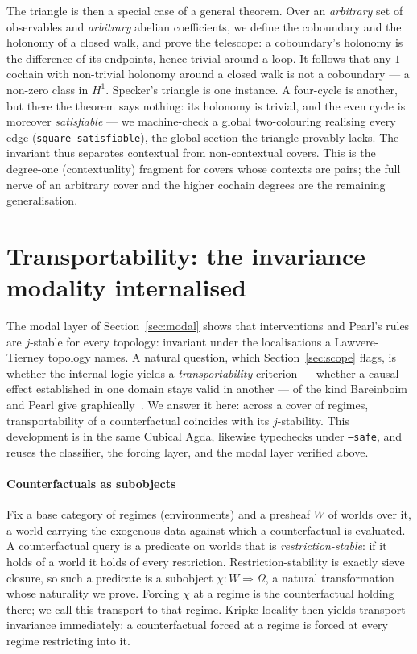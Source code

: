 \documentclass{lmcs}
\newcommand{\Om}{\Omega}
\begin{document}
The triangle is then a special case of a general theorem.
Over an \emph{arbitrary} set of observables and \emph{arbitrary} abelian coefficients, we define the coboundary and the holonomy of a closed walk, and prove the telescope: a coboundary's holonomy is the difference of its endpoints, hence trivial around a loop. It follows that any $1$-cochain with non-trivial holonomy around a closed walk is not a coboundary --- a non-zero class in $H^1$.
Specker's triangle is one instance. A four-cycle is another, but there the theorem says nothing: its holonomy is trivial, and the even cycle is moreover \emph{satisfiable} --- we machine-check a global two-colouring realising every edge (\texttt{square-satisfiable}), the global section the triangle provably lacks. The invariant thus separates contextual from non-contextual covers.
This is the degree-one (contextuality) fragment for covers whose contexts are pairs; the full nerve of an arbitrary cover and the higher cochain degrees are the remaining generalisation.

\section{Transportability: the invariance modality internalised}\label{sec:transport}

The modal layer of Section~\ref{sec:modal} shows that interventions and Pearl's rules are $j$-stable for every topology: invariant under the localisations a Lawvere-Tierney topology names.
A natural question, which Section~\ref{sec:scope} flags, is whether the internal logic yields a \emph{transportability} criterion --- whether a causal effect established in one domain stays valid in another --- of the kind Bareinboim and Pearl give graphically~\cite{bareinboim-pearl-2016}.
We answer it here: across a cover of regimes, transportability of a counterfactual coincides with its $j$-stability.
This development is in the same Cubical Agda, likewise typechecks under \texttt{--safe}, and reuses the classifier, the forcing layer, and the modal layer verified above.

\paragraph{Counterfactuals as subobjects}
Fix a base category of regimes (environments) and a presheaf $W$ of worlds over it, a world carrying the exogenous data against which a counterfactual is evaluated.
A counterfactual query is a predicate on worlds that is \emph{restriction-stable}: if it holds of a world it holds of every restriction.
Restriction-stability is exactly sieve closure, so such a predicate is a subobject $\chi : W \Rightarrow \Om$, a natural transformation whose naturality we prove.
Forcing $\chi$ at a regime is the counterfactual holding there; we call this transport to that regime.
Kripke locality then yields transport-invariance immediately: a counterfactual forced at a regime is forced at every regime restricting into it.
\end{document}
